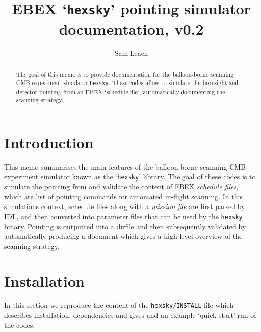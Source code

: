 \documentclass[a4paper,10pt]{article}
\title{EBEX `\texttt{hexsky}' pointing simulator documentation, v0.2} \author{Sam Leach}
\begin{document}
 \maketitle

\begin{abstract}
  The goal of this memo is to provide documentation for the
  balloon-borne scanning CMB experiment simulator
  \texttt{hexsky}. These codes allow to simulate the boresight and
  detector pointing from an EBEX `schedule file', automatically
  documenting the scanning strategy.
\end{abstract}


\tableofcontents


\section{Introduction}

This memo summarises the main features of the balloon-borne scanning
CMB experiment simulator known as the `\texttt{hexsky}' library. The goal
of these codes is to simulate the pointing from and validate the
content of EBEX \emph{schedule files}, which are list of pointing
commands for automated in-flight scanning. In this simulations
context, schedule files along with a \emph{mission file} are first
parsed by IDL, and then converted into parameter files that can be
used by the \texttt{hexsky} binary. Pointing is outputted into a dirfile
and then subsequently validated by automatically producing a document
which gives a high level overview of the scanning strategy.



\section{Installation}

In this section we reproduce the content of the
\texttt{hexsky/INSTALL} file which describes installation,
dependencies and gives and an example `quick start' run of the codes.




\end{document}
